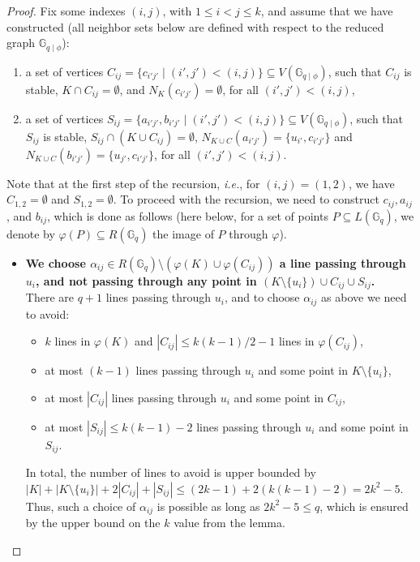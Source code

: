 \documentclass[a4paper,UKenglish,cleveref, autoref, thm-restate]{arxiv}
\newcommand{\ls}{\leqslant}
\newcommand{\G}[1][q]{\mathbb{G}_{#1}}
\newcommand{\Gphi}[1][q]{\mathbb{G}_{#1\mid\phi}}
\begin{document}
\begin{proof}
    \medskip\noindent Fix some indexes $(i,j)$, with $1\ls i < j \ls k$, and assume that we have constructed (all neighbor sets below are defined with respect to the reduced graph $\Gphi$):
    \begin{enumerate}
        \item a set of vertices $C_{ij} = \{c_{i' j'} \mid (i',j') < (i, j)  \} \subseteq V(\Gphi)$, such that $C_{ij}$ is stable,  $K\cap C_{ij} = \emptyset$, and $N_K(c_{i'j'}) = \emptyset$, for all $(i',j') < (i, j)$,
        \item a set of vertices  $S_{ij} = \{a_{i'j'},b_{i'j'} \mid (i',j') < (i, j) \} \subseteq V(\Gphi)$, 
              such that $S_{ij}$ is stable,  $S_{ij}\cap (K \cup C_{ij}) = \emptyset$,  $N_{K \cup C}(a_{i'j'}) = \{u_{i'}, c_{i'j'}\}$ and $N_{K \cup C}(b_{i'j'}) = \{u_{j'}, c_{i'j'}\}$, for all $(i',j') < (i, j)$.
    \end{enumerate}
    Note that at the first step of the recursion, \emph{i.e.}, for $(i,j) = (1,2)$, we have $C_{1,2} = \emptyset$ and $S_{1,2} = \emptyset$. To proceed with the recursion, we need to construct $c_{ij}, a_{ij}$, and $b_{ij}$, which is done as follows (here below, for a set of points $P\subseteq L(\G)$, we denote by $\varphi(P) \subseteq R(\G)$ the image of $P$ through $\varphi$).
    \begin{itemize}
        \item \textbf{We choose $\alpha_{ij}\in R(\G) \setminus (\varphi(K) \cup \varphi(C_{ij}))$ a line passing through $u_i$,  and not passing through any point in $(K \setminus \{u_i\}) \cup C_{ij} \cup S_{ij}$.} \\
        There are $q+1$ lines passing through $u_i$, and to choose $\alpha_{ij}$ as above we need to avoid:
        \begin{itemize}
            \item $k$ lines in $\varphi(K)$ and $|C_{ij}| \ls k(k-1)/2-1$ lines in $\varphi(C_{ij})$,
            \item at most $(k-1)$ lines passing through $u_i$ and some point in $K \setminus \{u_i\}$,
            \item at most $|C_{ij}|$ lines passing through $u_i$ and some point in $C_{ij}$,
            \item at most $|S_{ij}| \ls k(k-1)-2$ lines passing through $u_i$ and some point in $S_{ij}$.
        \end{itemize}
        In total, the number of lines to avoid is upper bounded by $|K| + |K \setminus \{u_i\}| + 2|C_{ij}| + |S_{ij}| \ls (2k-1) + 2(k(k-1)-2) = 2k^2 -5$. Thus, such a  choice of $\alpha_{ij}$ is possible as long as $2k^2 -5 \ls q$, which is ensured by the upper bound on the $k$ value from the lemma.


\end{itemize}
\end{proof}
\end{document}
